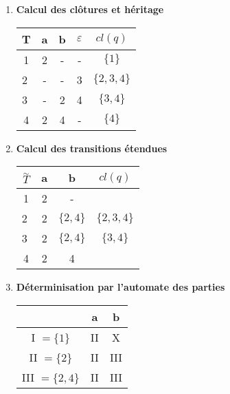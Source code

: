 \begin{example}[Déterminisation]
    \begin{enumerate}
        \item \textbf{Calcul des clôtures et héritage} 
            \begin{center}
                \begin{tabular}{c|c|c|c|c}
                    T & a & b & $\varepsilon$ & $cl(q)$ \\ \hline 
                    1 & 2 & - & - & $\{1\}$ \\ \hline 
                    \textcircled{2} & - & - & 3 & $\{2,3,4\} $ \\ \hline 
                    \textcircled{3} & - & 2 & 4 & $\{3,4\}$ \\ \hline 
                    4 & 2 & 4 & - & $\{4\}$
                \end{tabular}
            \end{center}
        \item \textbf{Calcul des transitions étendues}
            \begin{center}
                \begin{tabular}{c|c|c|c}
                    $\overset{\sim}{T}$ & a & b & $cl(q)$ \\ \hline 
                    1 & 2 & - & \\ \hline 
                    \textcircled{2} & 2 & $\{2,4\}$ & $\{2,3,4\}$ \\ \hline 
                    \textcircled{3} & 2 & $\{2,4\}$ & $\{3,4\}$ \\ \hline 
                    4 & 2 & 4 & \\
                \end{tabular}
            \end{center}
        \item \textbf{Déterminisation par l'automate des parties}
            \begin{center}
                \begin{minipage}{0.45\textwidth}
                    \begin{tabular}{c|c|c}
                        & a & b \\ \hline 
                        I $= \{1\}$ & II & X \\ \hline 
                        II $= \{2\}$ & II & III \\ \hline 
                        III $= \{2,4\}$ & II & III 
                    \end{tabular}
                \end{minipage}
                \hfill 
                \begin{minipage}{0.45\textwidth} %
                    \begin{tikzpicture}[shorten >=1pt, node distance=2cm, on grid, auto]
            

\end{tikzpicture}
\end{minipage}
\end{center}
\end{enumerate}
\end{example}
